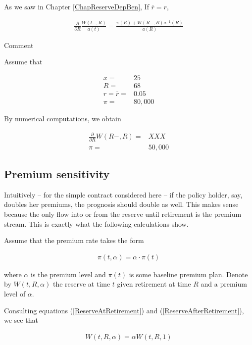 \documentclass{book}
\newcommand{\1}[1]{\mathbbm{1}_{\left\lbrace #1 \right\rbrace}}
\theoremstyle{break}
\theoremstyle{remark}
\newenvironment{remark}
  {\pushQED{\qed}\renewcommand{\qedsymbol}{\scalebox{1.4}{$\circ$}}\remarkx}
  {\popQED\endremarkx}
\numberwithin{equation}{section}
\begin{document}
\begin{remark}
As we saw in Chapter \ref{ChapReserveDepBen}, If $\bar{r}=r$, 

\begin{align*}
	\frac{\partial}{\partial R} \frac{W(t-,R)}{a(t)} = \frac{\pi (R) + W(R-,R) a^{-1}(R)}{a(R)}
\end{align*}
\end{remark}

Comment

\begin{example}
	Assume that
	
	\begin{align*}
		x =& 25 \\
		R =& 68 \\
		r = \bar{r} =& 0.05 \\
		\pi =& 80,000
	\end{align*}

	By numerical computations, we obtain
	
	\begin{align*}
		\frac{\partial}{\partial R} W(R-,R) =& XXX \\
		\pi =& 50,000
	\end{align*}
\end{example}

\subsection{Premium sensitivity}

Intuitively -- for the simple contract considered here -- if the policy holder, say, doubles her premiums, the prognosis should double as well. This makes sense because the only flow into or from the reserve until retirement is the premium stream. This is exactly what the following calculations show.

Assume that the premium rate takes the form

\begin{align*}
	\pi (t,\alpha) = \alpha \cdot \pi(t)
\end{align*}

where $\alpha$ is the premium level and $\pi(t)$ is some baseline premium plan. Denote by $W(t,R,\alpha)$ the reserve at time $t$ given retirement at time $R$ and a premium level of $\alpha$.

Consulting equations (\ref{ReserveAtRetirement}) and (\ref{ReserveAfterRetirement}), we see that

\begin{align*}
	W(t,R,\alpha) = \alpha W(t,R,1)
\end{align*}
\end{document}
